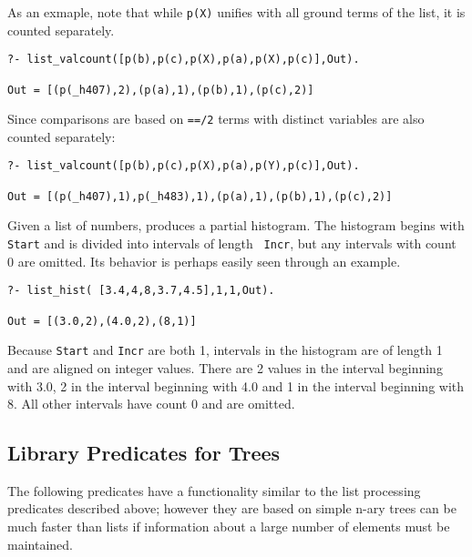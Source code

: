 \begin{description}
As an exmaple, note that while {\tt p(X)} unifies with all ground terms
of the list, it is counted separately.
\begin{verbatim}
?- list_valcount([p(b),p(c),p(X),p(a),p(X),p(c)],Out).

Out = [(p(_h407),2),(p(a),1),(p(b),1),(p(c),2)]
\end{verbatim}

Since comparisons are based on {\tt ==/2} terms with distinct
variables are also counted separately: 
\begin{verbatim}
?- list_valcount([p(b),p(c),p(X),p(a),p(Y),p(c)],Out).

Out = [(p(_h407),1),p(_h483),1),(p(a),1),(p(b),1),(p(c),2)]
\end{verbatim}

%
Given a list of numbers, produces a partial histogram.  The histogram
begins with {\tt Start} and is divided into intervals of length {\tt
  Incr}, but any intervals with count 0 are omitted.  Its behavior is
perhaps easily seen through an example.
\begin{verbatim}
?- list_hist( [3.4,4,8,3.7,4.5],1,1,Out).

Out = [(3.0,2),(4.0,2),(8,1)]
\end{verbatim}
Because {\tt Start} and {\tt Incr} are both 1, intervals in the
histogram are of length 1 and are aligned on integer values.  There
are 2 values in the interval beginning with 3.0, 2 in the interval
beginning with 4.0 and 1 in the interval beginning with 8.  All other
intervals have count 0 and are omitted.
    
\end{description}

\subsection{Library Predicates for Trees}

The following predicates have a functionality similar to the list
processing predicates described above; however they are based on
simple n-ary trees can be much faster than lists if information about
a large number of elements must be maintained.

